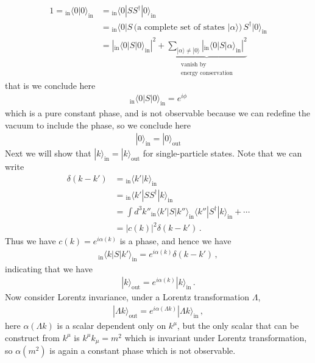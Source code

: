 \documentclass[11pt, onesided]{book}
\theoremstyle{break}
\theoremstyle{break}
\begin{document}
\begin{align*}
1 = {}_{\text{in}}\langle 0 | 0 \rangle_{\text{in}} 
&= {}_{\text{in}}\langle 0 | SS^\dagger |0\rangle_{\text{in}} \\
&= {}_{\text{in}}\langle 0 | S\, (\text{a complete set of states }|\alpha\rangle )\, S^\dagger |0\rangle_{\text{in}} \\
&= \left|{}_\text{in}\langle 0 |S|0\rangle_{\text{in}}\right|^2 +\underbrace{ \sum_{|\alpha\rangle \neq |0\rangle} \left|
 {}_{\text{in}}\langle 0 |S |\alpha\rangle_{\text{in}}\right|^2}_{\substack{\text{vanish by} \\\text{energy conservation}}}
\end{align*}
that is we conclude here 
\begin{align*}
{}_{\text{in}}\langle 0 | S | 0 \rangle_{\text{in}} = e^{i\phi}
\end{align*}
which is a pure constant phase, and is not observable because we can redefine the vacuum to include the phase, so we conclude here
\begin{align*}
|0\rangle_{\text{in}} = |0\rangle_{\text{out}}
\end{align*}
Next we will show that $|k\rangle_{\text{in}} = |k\rangle_{\text{out}}$ for single-particle states. Note that we can write
\begin{align*}
\delta(k-k') 
&= {}_{\text{in}}\langle k' | k \rangle_{\text{in}} \\
&= {}_{\text{in}}\langle k' |SS^\dagger| k \rangle_{\text{in}}\\
&= \int d^3 k'' {}_{\text{in}}\langle k' | S | k''\rangle_{\text{in}}\langle k''|S^\dagger | k\rangle_{\text{in}} + \cdots\\
&= |c(k)|^2\delta(k-k')\,.
\end{align*}
Thus we have $c(k) = e^{i\alpha(k)}$ is a phase, and hence we have
\begin{align*}
{}_\text{in}\langle k | S | k'\rangle_{\text{in}} = e^{i\alpha(k)}\delta(k-k')\,,
\end{align*}
indicating that we have
\begin{align*}
|k\rangle_{\text{out}} = e^{i\alpha(k)}|k\rangle_{\text{in}}\,.
\end{align*}
Now consider Lorentz invariance, under a Lorentz transformation $\Lambda$, 
\begin{align*}
|\Lambda k\rangle_{\text{out}} = e^{i\alpha(\Lambda k)}|\Lambda k\rangle_{\text{in}}\,,
\end{align*}
here $\alpha(\Lambda k)$ is a scalar dependent only on $k^\mu$, but the only scalar that can be construct from $k^\mu$ is $k^\mu k_\mu = m^2$ which is invariant under Lorentz transformation, so $\alpha(m^2)$ is again a constant phase which is not observable. \\
\end{document}

